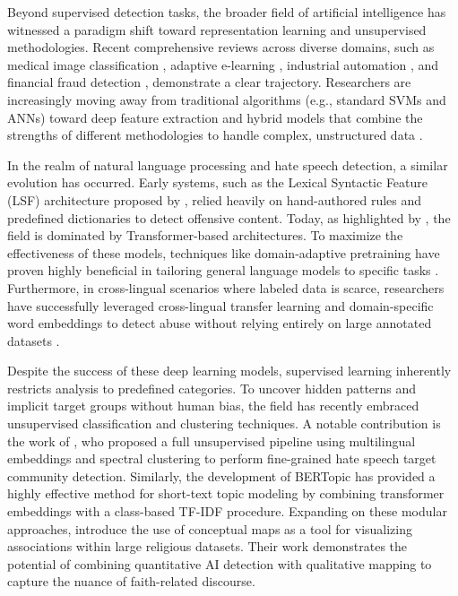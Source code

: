 \documentclass[../CLthesis.tex]{subfiles}
\begin{document}
Beyond supervised detection tasks, the broader field of artificial intelligence has witnessed a paradigm shift toward representation learning and unsupervised methodologies. Recent comprehensive reviews across diverse domains, such as medical image classification \citep{kim_transfer_2022}, adaptive e-learning \citep{gligorea_adaptive_2023}, industrial automation \citep{elahi_comprehensive_2023}, and financial fraud detection \citep{ali_financial_2022}, demonstrate a clear trajectory. Researchers are increasingly moving away from traditional algorithms (e.g., standard SVMs and ANNs) toward deep feature extraction and hybrid models that combine the strengths of different methodologies to handle complex, unstructured data \citep{azevedo_hybrid_2024}.

In the realm of natural language processing and hate speech detection, a similar evolution has occurred. Early systems, such as the Lexical Syntactic Feature (LSF) architecture proposed by \citet{chen_detecting_2012}, relied heavily on hand-authored rules and predefined dictionaries to detect offensive content. Today, as highlighted by \citet{ramos_comprehensive_2024}, the field is dominated by Transformer-based architectures. To maximize the effectiveness of these models, techniques like domain-adaptive pretraining have proven highly beneficial in tailoring general language models to specific tasks \citep{gururangan_dont_2020}. Furthermore, in cross-lingual scenarios where labeled data is scarce, researchers have successfully leveraged cross-lingual transfer learning and domain-specific word embeddings to detect abuse without relying entirely on large annotated datasets \citep{bigoulaeva_addressing_2022, monnar_cross-lingual_2024}.

Despite the success of these deep learning models, supervised learning inherently restricts analysis to predefined categories. To uncover hidden patterns and implicit target groups without human bias, the field has recently embraced unsupervised classification and clustering techniques. A notable contribution is the work of \citet{ollagnier_unsupervised_2023}, who proposed a full unsupervised pipeline using multilingual embeddings and spectral clustering to perform fine-grained hate speech target community detection. Similarly, the development of BERTopic \citep{grootendorst_bertopic_2022} has provided a highly effective method for short-text topic modeling by combining transformer embeddings with a class-based TF-IDF procedure. Expanding on these modular approaches, \citet{schlag_153detecting_2025} introduce the use of conceptual maps as a tool for visualizing associations within large religious datasets. Their work demonstrates the potential of combining quantitative AI detection with qualitative mapping to capture the nuance of faith-related discourse.
\end{document}
